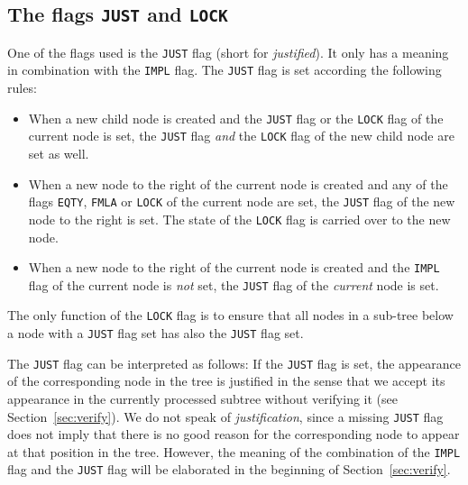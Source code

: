 \documentclass[british]{article}
\begin{document}
\subsection{The flags \texttt{JUST} and \texttt{LOCK}}

One of the flags used is the \texttt{JUST} flag (short for \emph{justified}). It
only has a meaning in combination with the \texttt{IMPL} flag. 
\medskip
The \texttt{JUST} flag is set according the following rules:

\begin{itemize}
	\item
		When a new child node is created and the \texttt{JUST} flag or the
		\texttt{LOCK} flag of the current node is set, the \texttt{JUST} flag
		\emph{and} the \texttt{LOCK} flag of the new child node are set as well. 
	\item
		When a new node to the right of the current node is created and any of
		the flags \texttt{EQTY}, \texttt{FMLA} or \texttt{LOCK} of the current
		node are set, the \texttt{JUST} flag of the new node to the right is
		set. The state of the \texttt{LOCK} flag is carried over to the new
		node.
	\item
		When a new node to the right of the current node is created and the
		\texttt{IMPL} flag of the current node is \emph{not} set, the
		\texttt{JUST} flag of the \emph{current} node is set.
\end{itemize}

The only function of the \texttt{LOCK} flag is to ensure that all nodes in a
sub-tree below a node with a \texttt{JUST} flag set has also the \texttt{JUST}
flag set.\newline

The \texttt{JUST} flag can be interpreted as follows: If the
\texttt{JUST} flag is set, the appearance of the corresponding node in the tree
is justified in the sense that we accept its appearance in the currently
processed subtree without verifying it (see Section~\ref{sec:verify}). We do not
speak of \emph{justification}, since a missing \texttt{JUST} flag does not imply
that there is no good reason for the corresponding node to appear at that
position in the tree. However, the meaning of the combination of the
\texttt{IMPL} flag and the \texttt{JUST} flag will be elaborated in the
beginning of Section~\ref{sec:verify}.
\end{document}
